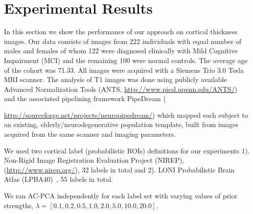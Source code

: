 \documentclass{llncs}
\begin{document}
\section{Experimental Results}
In this section we show the performance of our approach on cortical thickness images. Our data consists of images from 222 individuals with equal number of males and females of whom 122 were diagnosed clinically with Mild Cognitive Impairment (MCI) and the remaining 100 were normal controls. The average age of the cohort was 71.33. %
All images were acquired with a Siemens Trio 3.0 Tesla MRI scanner. The analysis of T1 images was done using publicly available Advanced Normalization Tools (ANTS, \url{http://www.picsl.upenn.edu/ANTS/}) and the associated pipelining framework PipeDream ({\url{http://sourceforge.net/projects/neuropipedream/}) which mapped each subject to an existing, elderly/neurodegenerative population template, built from images acquired from the same scanner and imaging parameters.

We used two cortical label (probabilistic ROIs) definitions for our experiments 1). Non-Rigid Image Registration Evaluation Project (NIREP),  (\url{http://www.nirep.org/}), 32 labels in total and  2). LONI Probabilistic Brain Atlas (LPBA40)~\cite{lpba}, 55 labels in total.


We ran AC-PCA independently for each label set with varying values of prior strengths, $\lambda =[0.1,0.2,0.5,1.0,2.0,5.0,10.0,20.0]$.

}
\end{document}
